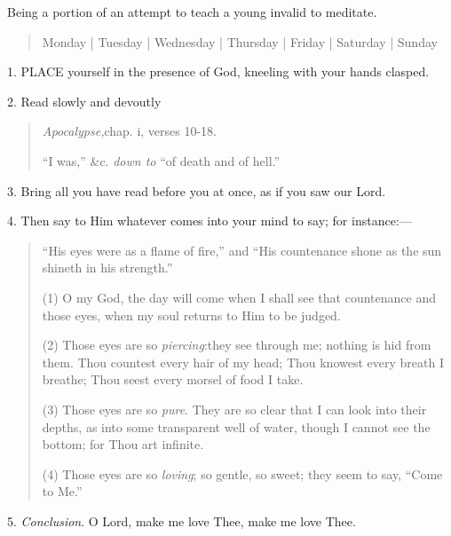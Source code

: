 
Being a portion of an attempt to
teach a young invalid to meditate.

\begin{quote}

Monday |
Tuesday | Wednesday | Thursday
| Friday | Saturday | Sunday

\end{quote}


1. PLACE
yourself in the presence of God, kneeling with your hands clasped.

2. Read slowly and devoutly

\begin{quote}

\emph{Apocalypse,}chap.
i, verses 10-18.

``I was,'' \&c. \emph{down to}
``of death and of hell.''

\end{quote}

3. Bring all you have read
before you at once, as if you saw our Lord.

4. Then say to Him whatever
comes into your mind to say; for instance:—

\begin{quote}

``His
eyes were as a flame of fire,'' and ``His countenance shone as the sun
shineth in his strength.''

(1) O my God, the day will
come when I shall see that countenance and those eyes, when my soul
returns to Him to be judged.

(2) Those eyes are so \emph{piercing}:\emph{}they see through me; nothing is hid from them. Thou countest every
hair of my head; Thou knowest every breath I breathe; Thou seest
every morsel of food I take.

(3) Those eyes are so \emph{pure}.
They are so clear that I can look into their depths, as into some
transparent well of water, though I cannot see the bottom; for Thou
art infinite.

(4) Those eyes are so \emph{loving};
so gentle, so sweet; they seem to say, ``Come to Me.''

\end{quote}

5. \emph{Conclusion}. O Lord,
make me love Thee, make me love Thee.


